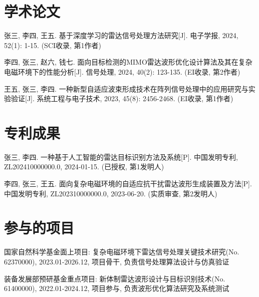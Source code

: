 \begin{resume}
\else

\section*{学术论文}

\begin{enumerate}[label={\hspace{2em}[\arabic*]},itemsep=0pt,parsep=0pt,labelwidth=0pt,labelsep=0pt,leftmargin=0pt,itemindent=0pt,align=left]
\item 张三, 李四, 王五. 基于深度学习的雷达信号处理方法研究[J]. 电子学报, 2024, 52(1): 1-15. (SCI收录, 第1作者)
\item 李四, 张三, 赵六, 钱七. 面向目标检测的MIMO雷达波形优化设计算法及其在复杂电磁环境下的性能分析[J]. 信号处理, 2024, 40(2): 123-135. (EI收录, 第2作者)
\item 王五, 张三, 李四. 一种新型自适应波束形成技术在阵列信号处理中的应用研究与实验验证[J]. 系统工程与电子技术, 2023, 45(8): 2456-2468. (EI收录, 第1作者)
\end{enumerate}

\section*{专利成果}

\begin{enumerate}[label={\hspace{2em}[\arabic*]},itemsep=0pt,parsep=0pt,labelwidth=0pt,labelsep=0pt,leftmargin=0pt,itemindent=0pt,align=left]
\item 张三, 李四. 一种基于人工智能的雷达目标识别方法及系统[P]. 中国发明专利, ZL202410000000.0, 2024-01-15. (已授权, 第1发明人)
\item 李四, 张三, 王五. 面向复杂电磁环境的自适应抗干扰雷达波形生成装置及方法[P]. 中国发明专利, ZL202310000000.0, 2023-06-20. (实质审查, 第2发明人)
\end{enumerate}

\section*{参与的项目}

\begin{enumerate}[label={\hspace{2em}[\arabic*]},itemsep=0pt,parsep=0pt,labelwidth=0pt,labelsep=0pt,leftmargin=0pt,itemindent=0pt,align=left]
\item 国家自然科学基金面上项目: 复杂电磁环境下雷达信号处理关键技术研究(No. 62370000), 2023.01-2026.12, 项目骨干, 负责信号处理算法设计与仿真验证
\item 装备发展部预研基金重点项目: 新体制雷达波形设计与目标识别技术(No. 61400000), 2022.01-2024.12, 项目参与, 负责波形优化算法研究及系统测试
\end{enumerate}

\fi
\end{resume}

